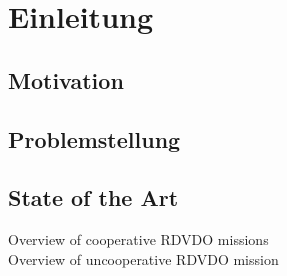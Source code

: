 \chapter{Einleitung}
		\section{Motivation}
		\section{Problemstellung}
		\section{State of the Art}
		Overview of cooperative RDVDO missions\\
		Overview of uncooperative RDVDO mission \\
